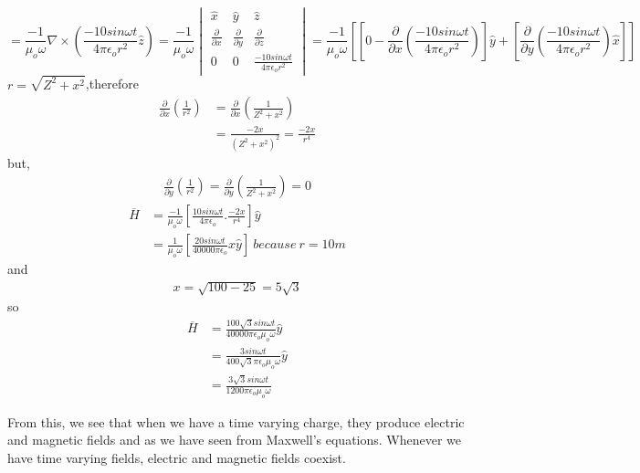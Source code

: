 \begin{exmp}
\begin{dmath*}
= \frac{-1}{\mu_o\omega}\nabla\times\left(\frac{-10sin\omega t}{4\pi\epsilon_o r^2} \hat{z}\right)=\frac{-1}{\mu_o\omega}\begin{vmatrix}
\hat{x} &\hat{y} &\hat{z}\\
\frac{\partial}{\partial x} & \frac{\partial}{\partial y} & \frac{\partial}{\partial z} \\
0 &0 &\frac{-10sin\omega t}{4\pi\epsilon_o r^2}
\end{vmatrix}
= \frac{-1}{\mu_o\omega}\left[\left[  0 - \frac{\partial}{\partial x}\left( \frac{-10sin\omega t}{4\pi \epsilon_o r^2}\right)  \right]\hat{y} + \left[ \frac{\partial}{\partial y}\left(\frac{-10sin\omega t}{4 \pi\epsilon_o r^2} \right)\hat{x}\right]\right] 
\end{dmath*}
$r = \sqrt{Z^2 + x^2}$,therefore
\begin{align*}
\frac{\partial }{\partial x}\left(\frac{1}{r^2} \right) &=  \frac{\partial }{\partial x}\left(\frac{1}{Z^2 + x^2} \right)\\
&= \frac{-2x}{(Z^2 + x^2)^2} = \frac{-2x}{r^4} 
\end{align*}
but,
\begin{align*}
\frac{\partial}{\partial y}\left(\frac{1}{r^2} \right) = \frac{\partial}{\partial y}\left(\frac{1}{Z^2 + x^2} \right) = 0  
\end{align*}
\begin{align*}
\overline{H} &= \frac{-1}{\mu_o\omega}\left[ \frac{10sin\omega t}{4\pi\epsilon_o}.\frac{-2x}{r^4}\right]\hat{y} \\
&= \frac{1}{\mu_o\omega}\left[ \frac{20sin\omega t}{40000\pi\epsilon_o}x\hat{y}\right] \ because\ r = 10m 
\end{align*}
and
\begin{align*}
x = \sqrt{100 - 25} = 5\sqrt{3}
\end{align*}
so
\begin{align*}
\overline{H} &=  \frac{100\sqrt{3}sin\omega t}{40000\pi\epsilon_o\mu_o\omega}\hat{y}\\
&= \frac{3sin\omega t}{400\sqrt{3}\pi\epsilon_o\mu_o\omega}\hat{y} \\
&= \frac{3\sqrt{3}sin\omega t}{1200\pi\epsilon_o\mu_o\omega}
\end{align*}
\end{exmp}

From this, we see that when we have a time varying charge, they produce electric and magnetic fields and as we have seen from Maxwell's equations. Whenever we have time varying fields, electric and magnetic fields coexist.

